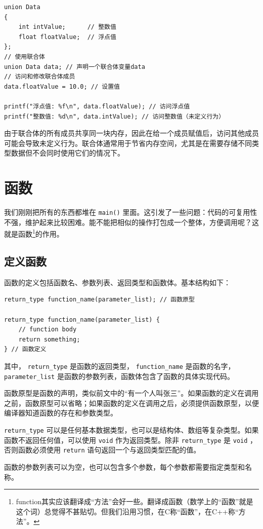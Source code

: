 \begin{verbatim}
union Data
{
    int intValue;      // 整数值
    float floatValue;  // 浮点值
};
// 使用联合体
union Data data; // 声明一个联合体变量data
// 访问和修改联合体成员
data.floatValue = 10.0; // 设置值

printf("浮点值: %f\n", data.floatValue); // 访问浮点值
printf("整数值: %d\n", data.intValue); // 访问整数值（未定义行为）
\end{verbatim}
由于联合体的所有成员共享同一块内存，因此在给一个成员赋值后，访问其他成员可能会导致未定义行为。联合体通常用于节省内存空间，尤其是在需要存储不同类型数据但不会同时使用它们的情况下。

\section{函数}

我们刚刚把所有的东西都堆在 \verb|main()| 里面。这引发了一些问题：代码的可复用性不强，维护起来比较困难。能不能把相似的操作打包成一个整体，方便调用呢？这就是函数\footnote{function其实应该翻译成“方法”会好一些。翻译成函数（数学上的“函数”就是这个词）总觉得不甚贴切。但我们沿用习惯，在C称“函数”，在C++称“方法”。}的作用。

\subsection{定义函数}

函数的定义包括函数名、参数列表、返回类型和函数体。基本结构如下：
\begin{verbatim}
return_type function_name(parameter_list); // 函数原型

return_type function_name(parameter_list) {
    // function body
    return something;
} // 函数定义
\end{verbatim}
其中， \verb|return_type| 是函数的返回类型， \verb|function_name| 是函数的名字， \verb|parameter_list| 是函数的参数列表，函数体包含了函数的具体实现代码。

函数原型是函数的声明，类似前文中的“有一个人叫张三”。如果函数的定义在调用之前，函数原型可以省略；如果函数的定义在调用之后，必须提供函数原型，以便编译器知道函数的存在和参数类型。

\verb|return_type| 可以是任何基本数据类型，也可以是结构体、数组等复杂类型。如果函数不返回任何值，可以使用 \verb|void| 作为返回类型。除非 \verb|return_type| 是 \verb|void| ，否则函数必须使用 \verb|return| 语句返回一个与返回类型匹配的值。

函数的参数列表可以为空，也可以包含多个参数，每个参数都需要指定类型和名称。

